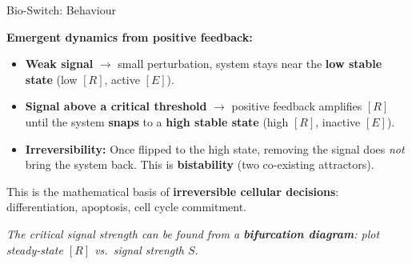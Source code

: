 \begin{frame}{Bio-Switch: Behaviour}

\textbf{Emergent dynamics from positive feedback:}

\vspace{0.3cm}
\begin{itemize}
    \item \textbf{Weak signal} $\to$ small perturbation, system stays near the \textbf{low stable state} (low $[R]$, active $[E]$).

    \item \textbf{Signal above a critical threshold} $\to$ positive feedback amplifies $[R]$ until the system \textbf{snaps} to a \textbf{high stable state} (high $[R]$, inactive $[E]$).

    \item \textbf{Irreversibility:} Once flipped to the high state, removing the signal does \emph{not} bring the system back. This is \textbf{bistability} (two co-existing attractors).
\end{itemize}

\vspace{0.3cm}
This is the mathematical basis of \textbf{irreversible cellular decisions}: differentiation, apoptosis, cell cycle commitment.

\vspace{0.2cm}
\textit{The critical signal strength can be found from a \textbf{bifurcation diagram}: plot steady-state $[R]$ vs.\ signal strength $S$.}
\end{frame}



